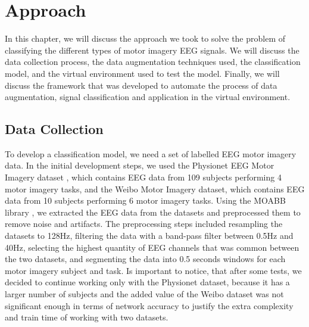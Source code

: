 \chapter{Approach}\label{ch:approach}
In this chapter, we will discuss the approach we took to solve the problem of classifying the different types of motor imagery EEG signals.
We will discuss the data collection process, the data augmentation techniques used, the classification model, and the virtual environment used to test the model. 
Finally, we will discuss the framework that was developed to automate the process of data augmentation, signal classification and application in the virtual environment.

\section{Data Collection}
To develop a classification model, we need a set of labelled EEG motor imagery data.
In the initial development steps, we used the Physionet EEG Motor Imagery dataset \cite{goldberger2000physiobank}, which contains EEG data from 109 subjects performing 4 motor imagery tasks, and the Weibo Motor Imagery \cite{yi2014evaluation} dataset, which contains EEG data from 10 subjects performing 6 motor imagery tasks.
Using the MOABB library \cite{Aristimunha_Mother_of_all_2023, chevallier2024largest, jayaram2018moabb}, we extracted the EEG data from the datasets and preprocessed them to remove noise and artifacts.
The preprocessing steps included resampling the datasets to 128Hz, filtering the data with a band-pass filter between 0.5Hz and 40Hz, selecting the highest quantity of EEG channels that was common between the two datasets, and segmenting the data into 0.5 seconds windows for each motor imagery subject and task.
Is important to notice, that after some tests, we decided to continue working only with the Physionet dataset, because it has a larger number of subjects and the added value of the Weibo dataset was not significant enough in terms of network accuracy to justify the extra complexity and train time of working with two datasets.

